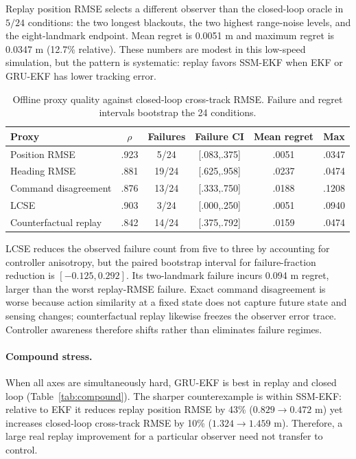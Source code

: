 \documentclass{article}
\begin{document}
Replay position RMSE selects a different observer than the closed-loop oracle in $5/24$ conditions: the two longest blackouts, the two highest range-noise levels, and the eight-landmark endpoint. Mean regret is 0.0051 m and maximum regret is 0.0347 m (12.7\% relative). These numbers are modest in this low-speed simulation, but the pattern is systematic: replay favors SSM-EKF when EKF or GRU-EKF has lower tracking error.

\begin{table}[t]
\centering
\caption{Offline proxy quality against closed-loop cross-track RMSE. Failure and regret intervals bootstrap the 24 conditions.}
\label{tab:proxies}
\small
\begin{tabular}{lccccc}
\toprule
Proxy & $\rho$ & Failures & Failure CI & Mean regret & Max\\
\midrule
Position RMSE & .923 & 5/24 & [.083,.375] & .0051 & .0347\\
Heading RMSE & .881 & 19/24 & [.625,.958] & .0237 & .0474\\
Command disagreement & .876 & 13/24 & [.333,.750] & .0188 & .1208\\
LCSE & .903 & 3/24 & [.000,.250] & .0051 & .0940\\
Counterfactual replay & .842 & 14/24 & [.375,.792] & .0159 & .0474\\
\bottomrule
\end{tabular}
\end{table}

LCSE reduces the observed failure count from five to three by accounting for controller anisotropy, but the paired bootstrap interval for failure-fraction reduction is $[-0.125,0.292]$. Its two-landmark failure incurs 0.094 m regret, larger than the worst replay-RMSE failure. Exact command disagreement is worse because action similarity at a fixed state does not capture future state and sensing changes; counterfactual replay likewise freezes the observer error trace. Controller awareness therefore shifts rather than eliminates failure regimes.

\paragraph{Compound stress.}
When all axes are simultaneously hard, GRU-EKF is best in replay and closed loop (Table~\ref{tab:compound}). The sharper counterexample is within SSM-EKF: relative to EKF it reduces replay position RMSE by 43\% ($0.829\rightarrow0.472$ m) yet increases closed-loop cross-track RMSE by 10\% ($1.324\rightarrow1.459$ m). Therefore, a large real replay improvement for a particular observer need not transfer to control.
\end{document}
